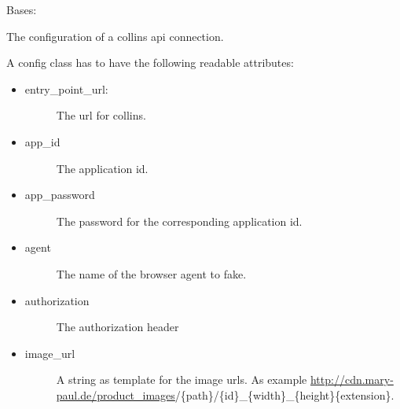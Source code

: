 \documentclass[letterpaper,10pt,english]{sphinxmanual}
\begin{document}
\begin{fulllineitems}
\label{collins:collins.Config}
Bases: 

The configuration of a collins api connection.

A config class has to have the following readable attributes:
\begin{itemize}
\item {} \begin{description}
\item[{entry\_point\_url:}] \leavevmode
The url for collins.

\end{description}

\item {} \begin{description}
\item[{app\_id}] \leavevmode
The application id.

\end{description}

\item {} \begin{description}
\item[{app\_password}] \leavevmode
The password for the corresponding application id.

\end{description}

\item {} \begin{description}
\item[{agent}] \leavevmode
The name of the browser agent to fake.

\end{description}

\item {} \begin{description}
\item[{authorization}] \leavevmode
The authorization header

\end{description}

\item {} \begin{description}
\item[{image\_url}] \leavevmode
A string as template for the image urls.
As example \href{http://cdn.mary-paul.de/product\_images}{http://cdn.mary-paul.de/product\_images}/\{path\}/\{id\}\_\{width\}\_\{height\}\{extension\}.


\end{description}
\end{itemize}
\end{fulllineitems}
\end{document}
